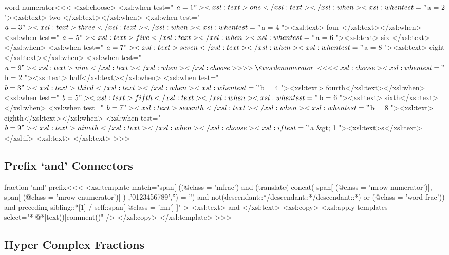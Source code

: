 \documentclass{article}
\begin{document}
\<word numerator\><<<
<xsl:choose>
   <xsl:when test=" $a = 1 "><xsl:text> one </xsl:text></xsl:when>
   <xsl:when test=" $a = 2 "><xsl:text> two </xsl:text></xsl:when>
   <xsl:when test=" $a = 3 "><xsl:text> three </xsl:text></xsl:when>
   <xsl:when test=" $a = 4 "><xsl:text> four </xsl:text></xsl:when>
   <xsl:when test=" $a = 5 "><xsl:text> five </xsl:text></xsl:when>
   <xsl:when test=" $a = 6 "><xsl:text> six </xsl:text></xsl:when>
   <xsl:when test=" $a = 7 "><xsl:text> seven </xsl:text></xsl:when>
   <xsl:when test=" $a = 8 "><xsl:text> eight </xsl:text></xsl:when>
   <xsl:when test=" $a = 9 "><xsl:text> nine </xsl:text></xsl:when>
</xsl:choose>
>>>


\<word enumerator\><<<
<xsl:choose>
   <xsl:when test=" $b = 2 "><xsl:text> half</xsl:text></xsl:when>
   <xsl:when test=" $b = 3 "><xsl:text> third</xsl:text></xsl:when>
   <xsl:when test=" $b = 4 "><xsl:text> fourth</xsl:text></xsl:when>
   <xsl:when test=" $b = 5 "><xsl:text> fifth</xsl:text></xsl:when>
   <xsl:when test=" $b = 6 "><xsl:text> sixth</xsl:text></xsl:when>
   <xsl:when test=" $b = 7 "><xsl:text> seventh</xsl:text></xsl:when>
   <xsl:when test=" $b = 8 "><xsl:text> eighth</xsl:text></xsl:when>
   <xsl:when test=" $b = 9 "><xsl:text> nineth</xsl:text></xsl:when>
</xsl:choose>
<xsl:if test=" $a &gt; 1 "><xsl:text>s</xsl:text></xsl:if>
<xsl:text> </xsl:text>
>>>


\subsection{Prefix `and' Connectors}

\<fraction 'and' prefix\><<<
<xsl:template match="span[
   ((@class = 'mfrac') and 
                       (translate(
                          concat(
                            span[ (@class = 'mrow-numerator')],
                            span[ (@class = 'mrow-enumerator')] 
                          )  ,'0123456789','') = '')
                       and
                       not(descendant::*/descendant::*/descendant::*)
    or 
    (@class = 'word-frac'))
   and 
   preceding-sibling::*[1]
       / self::span[ @class = 'mn']
 ]" >
  <xsl:text> and </xsl:text>
  <xsl:copy>
    <xsl:apply-templates select="*|@*|text()|comment()" />
  </xsl:copy>
</xsl:template> 
>>>

\subsection{Hyper Complex Fractions}
\end{document}
